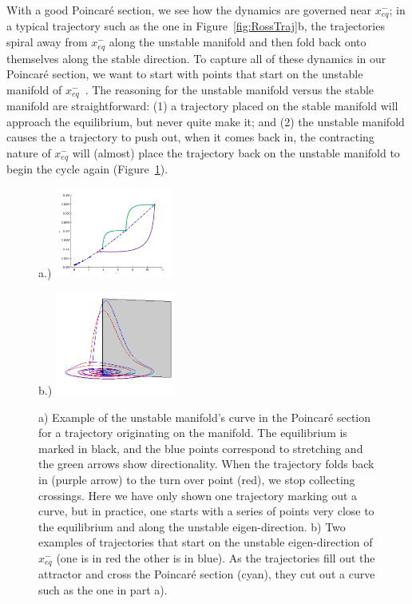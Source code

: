 \documentclass[12 pt]{article}
\begin{document}
With a good Poincar\'e section, we see how the dynamics are governed near
$x_{eq}^{-}$; in a typical trajectory such as the one in
Figure~\ref{fig:RossTraj}b, the trajectories spiral away from
$x_{eq}^{-}$ along the unstable manifold and then fold back onto
themselves along the stable direction.  To capture all of these dynamics
in our Poincar\'e section, we want to start with points that start on the
unstable manifold of $x_{eq}^{-}$~\cite{Eth}.  The reasoning for the
unstable manifold versus the stable manifold are straightforward: (1) a
trajectory placed on the stable manifold will approach the equilibrium,
but never quite make it; and (2) the unstable manifold causes the a
trajectory to push out, when it comes back in, the contracting nature of
$x_{eq}^{-}$ will (almost) place the trajectory back on the unstable
manifold to begin the cycle again (Figure~\ref{fig:RossUnstable}).
\begin{figure}[h]
\centering
a.)  \includegraphics[width=0.35\textwidth]
      {Figs/Section1/kcsinglettrajectoryalongPSdirection.png}

b.)  \includegraphics[width=0.35\textwidth]
                     {Figs/Section1/kcRosslerUnstableManPSc.png}
\caption{
a) Example of the unstable manifold's curve in the Poincar\'e section for
a trajectory originating on the manifold.  The equilibrium is marked in
black, and the blue points correspond to stretching and the green arrows
show directionality.  When the trajectory folds back in (purple arrow) to
the turn over point (red), we stop collecting crossings.  Here we have
only shown one trajectory marking out a curve, but in practice, one
starts with a series of points very close to the equilibrium and along
the unstable eigen-direction.
b) Two examples of trajectories that start on the unstable
eigen-direction of $x_{eq}^{-}$ (one is in red the other is in blue). As
the trajectories fill out the attractor and cross the Poincar\'e section
(cyan), they cut out a curve such as the one in part a).
}
 \label{fig:RossUnstable}
\end{figure}
\end{document}

